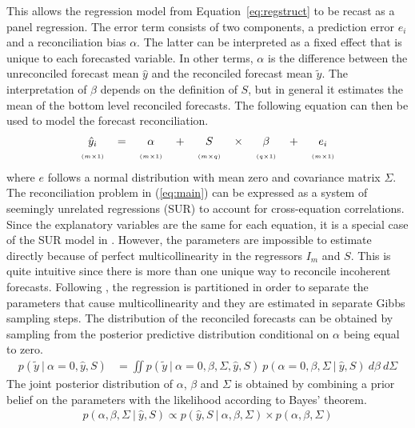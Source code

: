 \documentclass[a4paper,fleqn,11pt]{article}
\begin{document}
This allows the regression model from Equation~\ref{eq:regstruct} to be recast as a panel regression. The error term consists of two components, a prediction error $e_{i}$ and a reconciliation bias $\alpha$. The latter can be interpreted as a fixed effect that is unique to each forecasted variable. In other terms, $\alpha$ is the difference between the unreconciled forecast mean $\hat{y}$ and the reconciled forecast mean $\tilde{y}$. The interpretation of $\beta$ depends on the definition of $S$, but in general it estimates the mean of the bottom level reconciled forecasts. The following equation can then be used to model the forecast reconciliation.
\begin{align}
\label{eq:main}
\begin{tabular}{ccccccccc}
	$\hat{y}_i$ & $=$ & $\alpha$ & + &$S$ & $\times$ & $\beta$ & $+$ & $e_i$ \\
	$\scriptscriptstyle (m\times 1)$ & & $\scriptscriptstyle (m\times 1)$ & & $ \scriptscriptstyle (m\times q) $ & & $\scriptscriptstyle (q\times 1)$ & & $\scriptscriptstyle (m\times 1)$
\end{tabular}
\end{align}
where $e$ follows a normal distribution with mean zero and covariance matrix $\Sigma$. The reconciliation problem in (\ref{eq:main}) can be expressed as a system of seemingly unrelated regressions (SUR) to account for cross-equation correlations. Since the explanatory variables are the same for each equation, it is a special case of the SUR model in \cite{Zellner1962}. However, the parameters are impossible to estimate directly because of perfect multicollinearity in the regressors $I_m$ and $S$. This is quite intuitive since there is more than one unique way to reconcile incoherent forecasts. Following \cite{Farebrother1978}, the regression is partitioned in order to separate the parameters that cause multicollinearity and they are estimated in separate Gibbs sampling steps. The distribution of the reconciled forecasts can be obtained by sampling from the posterior predictive distribution conditional on $\alpha$ being equal to zero.
\begin{align*}
p(\tilde{y}\ |\ \alpha = 0,\hat{y}, S) &= \iint p(\tilde{y}\ |\ \alpha = 0,\beta,\Sigma,\hat{y},S)\ p(\alpha = 0,\beta,\Sigma\ |\ \hat{y},S)\ d\beta\ d\Sigma
\end{align*}
The joint posterior distribution of $\alpha$, $\beta$ and $\Sigma$ is obtained by combining a prior belief on the parameters with the likelihood according to Bayes' theorem.
\begin{align}
p(\alpha, \beta, \Sigma\ |\ \hat{y}, S) \propto p(\hat{y}, S\ |\ \alpha, \beta, \Sigma) \times p(\alpha, \beta, \Sigma)
\end{align}
\end{document}
